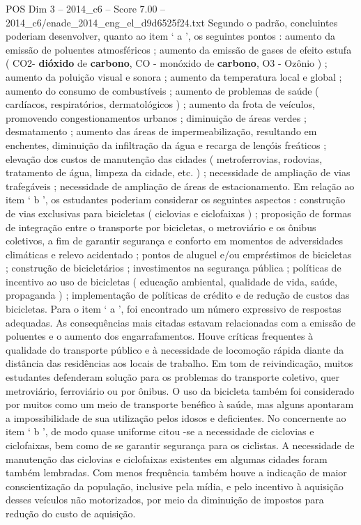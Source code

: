 \begin{textsample}{POS Dim 3 – 2014\_c6 – Score 7.00 – 2014\_c6/enade\_2014\_eng\_el\_d9d6525f24.txt}
Segundo o padrão, concluintes poderiam desenvolver, quanto ao item ‘ a ’, os seguintes pontos : aumento da emissão de poluentes atmosféricos ; aumento da emissão de gases de efeito estufa ( CO2- \textbf{dióxido} de \textbf{carbono}, CO - monóxido de \textbf{carbono}, O3 - Ozônio ) ; aumento da poluição visual e sonora ; aumento da temperatura local e global ; aumento do consumo de combustíveis ; aumento de problemas de saúde ( cardíacos, respiratórios, dermatológicos ) ; aumento da frota de veículos, promovendo congestionamentos urbanos ; diminuição de áreas verdes ; desmatamento ; aumento das áreas de impermeabilização, resultando em enchentes, diminuição da infiltração da água e recarga de lençóis freáticos ; elevação dos custos de manutenção das cidades ( metroferrovias, rodovias, tratamento de água, limpeza da cidade, etc. ) ; necessidade de ampliação de vias trafegáveis ; necessidade de ampliação de áreas de estacionamento.
Em relação ao item ‘ b ’, os estudantes poderiam considerar os seguintes aspectos : construção de vias exclusivas para bicicletas ( ciclovias e ciclofaixas ) ; proposição de formas de integração entre o transporte por bicicletas, o metroviário e os ônibus coletivos, a fim de garantir segurança e conforto em momentos de adversidades climáticas e relevo acidentado ; pontos de aluguel e/ou empréstimos de bicicletas ; construção de bicicletários ; investimentos na segurança pública ; políticas de incentivo ao uso de bicicletas ( educação ambiental, qualidade de vida, saúde, propaganda ) ; implementação de políticas de crédito e de redução de custos das bicicletas.
Para o item ‘ a ’, foi encontrado um número expressivo de respostas adequadas.
As consequências mais citadas estavam relacionadas com a emissão de poluentes e o aumento dos engarrafamentos.
Houve críticas frequentes à qualidade do transporte público e à necessidade de locomoção rápida diante da distância das residências aos locais de trabalho.
Em tom de reivindicação, muitos estudantes defenderam solução para os problemas do transporte coletivo, quer metroviário, ferroviário ou por ônibus.
O uso da bicicleta também foi considerado por muitos como um meio de transporte benéfico à saúde, mas alguns apontaram a impossibilidade de sua utilização pelos idosos e deficientes.
No concernente ao item ‘ b ’, de modo quase uniforme citou -se a necessidade de ciclovias e ciclofaixas, bem como de se garantir segurança para os ciclistas.
A necessidade de manutenção das ciclovias e ciclofaixas existentes em algumas cidades foram também lembradas.
Com menos frequência também houve a indicação de maior conscientização da população, inclusive pela mídia, e pelo incentivo à aquisição desses veículos não motorizados, por meio da diminuição de impostos para redução do custo de aquisição.

\end{textsample}
